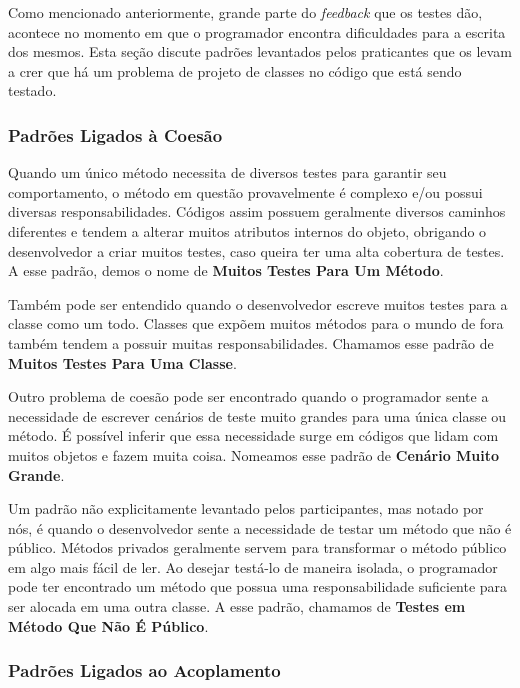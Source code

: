 \documentclass[conference]{IEEEtran}
\begin{document}
Como mencionado anteriormente, grande parte do \textit{feedback} que os testes
dão, acontece no momento em que o programador encontra dificuldades para a
escrita dos mesmos. Esta seção discute padrões levantados pelos praticantes
que os levam a crer que há um problema de projeto de classes no código
que está sendo testado.

\subsubsection{Padrões Ligados à Coesão}

Quando um único método necessita de diversos testes para garantir seu comportamento,
o método em questão provavelmente é complexo e/ou possui diversas responsabilidades.
Códigos assim possuem geralmente diversos caminhos
diferentes e tendem a alterar muitos atributos internos do objeto, obrigando o desenvolvedor
a criar muitos testes, caso queira ter uma alta cobertura de testes.
A esse padrão, demos o nome de \textbf{Muitos Testes Para Um Método}.

Também pode ser entendido quando o desenvolvedor escreve muitos testes para a 
classe como um todo. Classes que expõem muitos métodos para o mundo de fora
também tendem a possuir muitas responsabilidades. Chamamos esse padrão
de \textbf{Muitos Testes Para Uma Classe}.

Outro problema de coesão pode ser encontrado quando o programador
sente a necessidade de escrever cenários de teste muito grandes para uma
única classe ou método. É possível inferir que essa necessidade surge 
em códigos que lidam com muitos objetos e fazem muita coisa. Nomeamos
esse padrão de \textbf{Cenário Muito Grande}.

Um padrão não explicitamente levantado pelos participantes, mas notado
por nós, é quando o desenvolvedor sente a necessidade de testar
um método que não é público. Métodos privados geralmente servem para 
transformar o método público em algo mais fácil de ler. Ao desejar
testá-lo de maneira isolada, o programador pode ter encontrado
um método que possua uma responsabilidade suficiente para ser
alocada em uma outra classe. A esse padrão, chamamos de 
\textbf{Testes em Método Que Não É Público}.

\subsubsection{Padrões Ligados ao Acoplamento}
\end{document}
